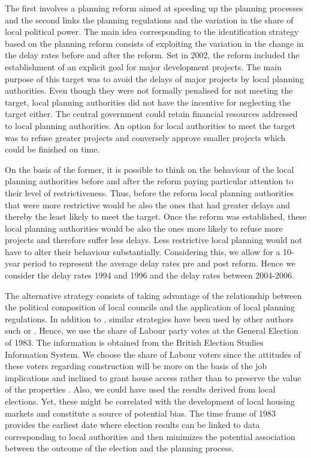 \documentclass[12pt,letterpaper]{article}
\begin{document}
    The first involves a planning reform aimed at speeding up the planning processes and the
   second links the planning regulations and the variation in the share of local political power. 
The main idea corresponding to the identification strategy based on the planning reform consists
 of exploiting the variation in the change in the delay rates before and after the reform. Set in 2002,
  the reform included the establishment of an explicit goal for major development projects. The main
   purpose of this target was to avoid the delays of major projects by local planning authorities. 
   Even though they were not formally penalised for not meeting the target, local planning authorities did not have
     the incentive for neglecting the target either. The central government could retain financial resources
      addressed to local planning authorities. An option for local authorities to meet the target was to refuse 
      greater projects and conversely approve smaller projects which could be finished on time. 
      
On the basis of the former, it is possible to think on the behaviour of the local planning authorities
 before and after the reform paying particular attention to their level of restrictiveness. Thus, before 
 the reform local planning authorities that were more restrictive would be also the ones that had greater 
 delays and thereby the least likely to meet the target. Once the reform was established, these local 
 planning authorities would be also the ones more likely to refuse more projects and therefore suffer less
  delays. Less restrictive local planning would not have to alter their behaviour substantially.
   Considering this, we allow for a 10-year period to represent the average delay rates pre and post reform.
    Hence we consider the delay rates 1994 and 1996 and the delay rates between 2004-2006.  
    
The alternative strategy consists of taking advantage of the relationship between the political composition of local councils
 and the application of local planning regulations. In addition to 
 \citet{hilber2016supply},
  similar strategies have been used by other authors such \cite{bertrand2002does} or 
  \cite{sadun2015}. 
  Hence, we use the share of Labour party votes at the General Election of 1983.
   The information is obtained from the British Election Studies Information System.  
   We choose the share of Labour voters since the attitudes of these voters 
   regarding construction
   will be more on the basis of the job implications and inclined to grant house access rather than to preserve
    the value of the properties \citep{cheshire2016}.
    Also, we could have used the results derived from local elections. 
    Yet, these might be correlated with the development of local housing markets and constitute a source
     of potential bias. The time frame of 1983 provides the earliest date where election results can be linked
      to data corresponding to local authorities and then minimizes the potential association between the
       outcome of the election and the planning process.
\end{document}
